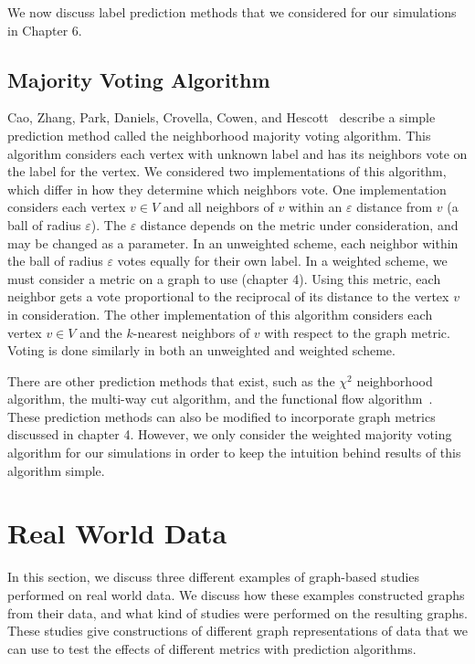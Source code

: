 We now discuss label prediction methods that we considered for our 
simulations in Chapter 6.

\subsection{Majority Voting Algorithm}
Cao, Zhang, Park, Daniels, Crovella, Cowen, and Hescott~\cite{10.1371/journal.pone.0076339}
describe a simple prediction method called the neighborhood majority voting
algorithm. This algorithm considers each vertex with unknown label and has
its neighbors vote on the label for the vertex. We considered two
implementations of this algorithm, which differ in how they determine which neighbors vote. One 
implementation considers each vertex $v \in V$ and all neighbors of $v$ within an $\varepsilon$
distance from $v$ (a ball of radius $\varepsilon$). The $\varepsilon$ distance depends on the metric
under consideration, and may be changed as a parameter. In an unweighted scheme, each neighbor
within the ball of radius $\varepsilon$ votes equally for their own label. In 
a weighted scheme, we must consider a metric on a graph to use (chapter 4).
Using this metric, each neighbor gets a vote proportional to the reciprocal 
of its distance to the vertex $v$ in
consideration. The other implementation of this algorithm considers each vertex $v \in V$ and
the $k$-nearest neighbors of $v$ with respect to the graph metric. Voting is done similarly in both an unweighted and weighted
scheme.

There are other prediction methods that exist, such as the $\chi^{2}$ neighborhood algorithm, the
multi-way cut algorithm, and the functional flow algorithm~\cite{10.1371/journal.pone.0076339}.
These prediction methods can also be modified to incorporate graph metrics discussed in chapter 4.
However, we only consider the weighted majority voting algorithm for our simulations in order to
keep the intuition behind results of this algorithm simple.

\section{Real World Data}

In this section, we discuss three different examples of graph-based studies performed on real world
data. We discuss how these examples constructed graphs from their data, and what kind of studies
were performed on the resulting graphs. These studies give constructions of different graph
representations of data that we can use to test the effects of different metrics with prediction
algorithms.

